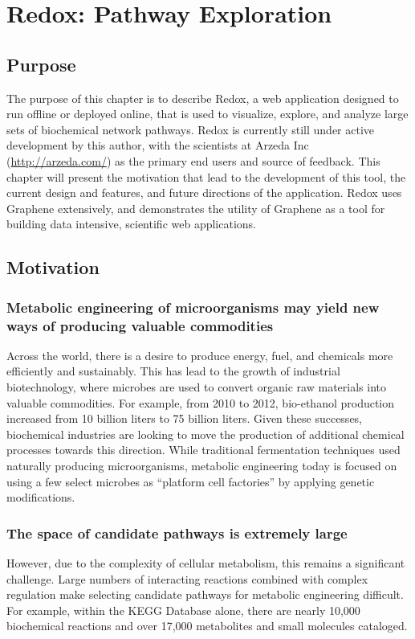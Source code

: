 \chapter{Redox: Pathway Exploration}
\label{chap:redox}

\section{Purpose}
The purpose of this chapter is to describe Redox, a web application designed to run offline or deployed online, that is used to visualize, explore, and analyze large sets of biochemical network pathways.
Redox is currently still under active development by this author, with the scientists at Arzeda Inc (\url{http://arzeda.com/}) as the primary end users and source of feedback.
This chapter will present the motivation that lead to the development of this tool, the current design and features, and future directions of the application.
Redox uses Graphene extensively, and demonstrates the utility of Graphene as a tool for building data intensive, scientific web applications.

\section{Motivation}
\subsection{Metabolic engineering of microorganisms may yield new ways of producing valuable commodities}

Across the world, there is a desire to produce energy, fuel, and chemicals more efficiently and sustainably.
This has lead to the growth of industrial biotechnology, where microbes are used to convert organic raw materials into valuable commodities. \autocite{nielsen1998metabolic, sauer2012construction}
For example, from 2010 to 2012, bio-ethanol production increased from 10 billion liters to 75 billion liters.
Given these successes, biochemical industries are looking to move the production of additional chemical processes towards this direction.
While traditional fermentation techniques used naturally producing microorganisms, metabolic engineering today is focused on using a few select microbes as “platform cell factories” by applying genetic modifications.

\subsection{The space of candidate pathways is extremely large}
However, due to the complexity of cellular metabolism, this remains a significant challenge. \autocite{sohn2010genome}
Large numbers of interacting reactions combined with complex regulation make selecting candidate pathways for metabolic engineering difficult.
For example, within the KEGG Database alone, there are nearly 10,000 biochemical reactions and over 17,000 metabolites and small molecules cataloged.

